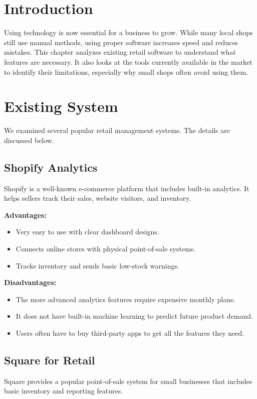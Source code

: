 \documentclass[12pt,a4paper]{report}
\begin{document}
\section{Introduction}
Using technology is now essential for a business to grow. While many local shops still use manual methods, using proper software increases speed and reduces mistakes. This chapter analyzes existing retail software to understand what features are necessary. It also looks at the tools currently available in the market to identify their limitations, especially why small shops often avoid using them.

\section{Existing System}
We examined several popular retail management systems. The details are discussed below.

\subsection{Shopify Analytics}
Shopify is a well-known e-commerce platform that includes built-in analytics. It helps sellers track their sales, website visitors, and inventory.

\textbf{Advantages:}
\begin{itemize}
    \item Very easy to use with clear dashboard designs.
    \item Connects online stores with physical point-of-sale systems.
    \item Tracks inventory and sends basic low-stock warnings.
\end{itemize}

\textbf{Disadvantages:}
\begin{itemize}
    \item The more advanced analytics features require expensive monthly plans.
    \item It does not have built-in machine learning to predict future product demand.
    \item Users often have to buy third-party apps to get all the features they need.
\end{itemize}

\subsection{Square for Retail}
Square provides a popular point-of-sale system for small businesses that includes basic inventory and reporting features.
\end{document}
